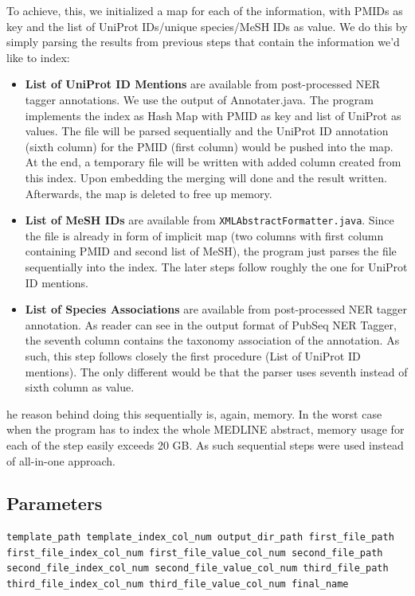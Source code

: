 To achieve, this, we initialized a map for each of the information, with PMIDs as key and the list of UniProt IDs/unique species/MeSH IDs as value. We do this by simply parsing the results from previous steps that contain the information we'd like to index:

\begin{itemize}
\item \textbf{List of UniProt ID Mentions} are available from post-processed NER tagger annotations. We use the output of Annotater.java. The program implements the index as Hash Map with PMID as key and list of UniProt as values. The file will be parsed sequentially and the UniProt ID annotation (sixth column) for the PMID (first column) would be pushed into the map. At the end, a temporary file will be written with added column created from this index. Upon embedding the merging will done and the result written. Afterwards, the map is deleted to free up memory.
\item \textbf{List of MeSH IDs} are available from \texttt{XMLAbstractFormatter.java}. Since the file is already in form of implicit map (two columns with first column containing PMID and second list of MeSH), the program just parses the file sequentially into the index. The later steps follow roughly the one for UniProt ID mentions.
\item \textbf{List of Species Associations} are available from post-processed NER tagger annotation. As reader can see in the output format of PubSeq NER Tagger, the seventh column contains the taxonomy association of the annotation. As such, this step follows closely the first procedure (List of UniProt ID mentions). The only different would be that the parser uses seventh instead of sixth column as value.
\end{itemize}

he reason behind doing this sequentially is, again, memory. In the worst case when the program has to index the whole MEDLINE abstract, memory usage for each of the step easily exceeds 20 GB. As such sequential steps were used instead of all-in-one approach.

\subsection{Parameters}

\begin{lstlisting}[breaklines]
template_path template_index_col_num output_dir_path first_file_path first_file_index_col_num first_file_value_col_num second_file_path second_file_index_col_num second_file_value_col_num third_file_path third_file_index_col_num third_file_value_col_num final_name
\end{lstlisting}

